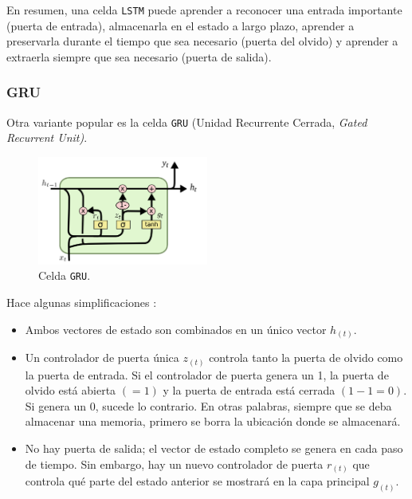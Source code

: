 \documentclass[a4paper,12pt]{article}
\begin{document}
En resumen, una celda \texttt{LSTM} puede aprender a reconocer una entrada importante (puerta de entrada), almacenarla en el estado a largo plazo, aprender a preservarla durante el tiempo que sea necesario (puerta del olvido) y aprender a extraerla siempre que sea necesario (puerta de salida).

\subsubsection{GRU}

Otra variante popular es la celda \texttt{GRU} (Unidad Recurrente Cerrada, \textit{Gated Recurrent Unit)}. \citep{olahlstm}

\begin{figure}[H]
	\begin{center}				
		\includegraphics[width=0.5\textwidth]{gru2.png}
		\caption{Celda \texttt{GRU}. \citep{olahlstm}}
		\label{fig:lstm5}
	\end{center}
\end{figure}

Hace algunas simplificaciones \citep{geron}:

\begin{itemize}[noitemsep, topsep=2pt]
	\item Ambos vectores de estado son combinados en un único vector $h_{(t)}$.
	\item Un controlador de puerta única $z_{(t)}$ controla tanto la puerta de olvido como la puerta de entrada. Si el controlador de puerta genera un 1, la puerta de olvido está abierta $(=1)$ y la puerta de entrada está cerrada $(1-1=0)$. Si genera un 0, sucede lo contrario. En otras palabras, siempre que se deba almacenar una memoria, primero se borra la ubicación donde se almacenará.
	\item No hay puerta de salida; el vector de estado completo se genera en cada paso de tiempo. Sin embargo, hay un nuevo controlador de puerta $r_{(t)}$ que controla qué parte del estado anterior se mostrará en la capa principal $g_{(t)}$.
	      	      
\end{itemize}
\end{document}
